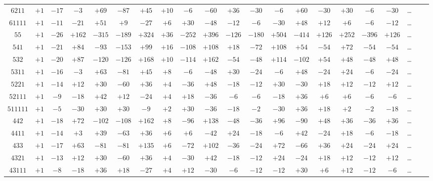 \documentclass[12pt,a4paper]{article}
\theoremstyle{definition}
\begin{document}
\begin{center}
\begin{tabular}{c|c|c|c|c|c|c|c|c|c|c|c|c|c|c|c|c|c|c|c|c}
$6211$ & $+1$ & $-17$ & $-3$ & $+69$ & $-87$ & $+45$ & $+10$ & $-6$ & $-60$ & $+36$ & $-30$ & $-6$ & $+60$ & $-30$ & $+30$ & $-6$ & $-30$ & \dots \\
$61111$ & $+1$ & $-11$ & $-21$ & $+51$ & $+9$ & $-27$ & $+6$ & $+30$ & $-48$ & $-12$ & $-6$ & $-30$ & $+48$ & $+12$ & $+6$ & $-6$ & $-12$ & \dots \\
$55$ & $+1$ & $-26$ & $+162$ & $-315$ & $-189$ & $+324$ & $+36$ & $-252$ & $+396$ & $-126$ & $-180$ & $+504$ & $-414$ & $+126$ & $+252$ & $-396$ & $+126$ & \dots \\
$541$ & $+1$ & $-21$ & $+84$ & $-93$ & $-153$ & $+99$ & $+16$ & $-108$ & $+108$ & $+18$ & $-72$ & $+108$ & $+54$ & $-54$ & $+72$ & $-54$ & $-54$ & \dots \\
$532$ & $+1$ & $-20$ & $+87$ & $-120$ & $-126$ & $+168$ & $+10$ & $-114$ & $+162$ & $-54$ & $-48$ & $+114$ & $-102$ & $+54$ & $+48$ & $-48$ & $+48$ & \dots \\
$5311$ & $+1$ & $-16$ & $-3$ & $+63$ & $-81$ & $+45$ & $+8$ & $-6$ & $-48$ & $+30$ & $-24$ & $-6$ & $+48$ & $-24$ & $+24$ & $-6$ & $-24$ & \dots \\
$5221$ & $+1$ & $-14$ & $+12$ & $+30$ & $-60$ & $+36$ & $+4$ & $-36$ & $+48$ & $-18$ & $-12$ & $+30$ & $-30$ & $+18$ & $+12$ & $-12$ & $+12$ & \dots \\
$52111$ & $+1$ & $-9$ & $-18$ & $+42$ & $+12$ & $-24$ & $+4$ & $+18$ & $-36$ & $-6$ & $-6$ & $-18$ & $+36$ & $+6$ & $+6$ & $-6$ & $-6$ & \dots \\
$511111$ & $+1$ & $-5$ & $-30$ & $+30$ & $+30$ & $-9$ & $+2$ & $+30$ & $-36$ & $-18$ & $-2$ & $-30$ & $+36$ & $+18$ & $+2$ & $-2$ & $-18$ & \dots \\
$442$ & $+1$ & $-18$ & $+72$ & $-102$ & $-108$ & $+162$ & $+8$ & $-96$ & $+138$ & $-48$ & $-36$ & $+96$ & $-90$ & $+48$ & $+36$ & $-36$ & $+36$ & \dots \\
$4411$ & $+1$ & $-14$ & $+3$ & $+39$ & $-63$ & $+36$ & $+6$ & $+6$ & $-42$ & $+24$ & $-18$ & $-6$ & $+42$ & $-24$ & $+18$ & $-6$ & $-18$ & \dots \\
$433$ & $+1$ & $-17$ & $+63$ & $-81$ & $-81$ & $+135$ & $+6$ & $-72$ & $+102$ & $-36$ & $-24$ & $+72$ & $-66$ & $+36$ & $+24$ & $-24$ & $+24$ & \dots \\
$4321$ & $+1$ & $-13$ & $+12$ & $+30$ & $-60$ & $+36$ & $+4$ & $-30$ & $+42$ & $-18$ & $-12$ & $+24$ & $-24$ & $+18$ & $+12$ & $-12$ & $+12$ & \dots \\
$43111$ & $+1$ & $-8$ & $-18$ & $+36$ & $+18$ & $-27$ & $+4$ & $+12$ & $-30$ & $-6$ & $-12$ & $-12$ & $+30$ & $+6$ & $+12$ & $-12$ & $-6$ & \dots \\

\end{tabular}
\end{center}
\end{document}
